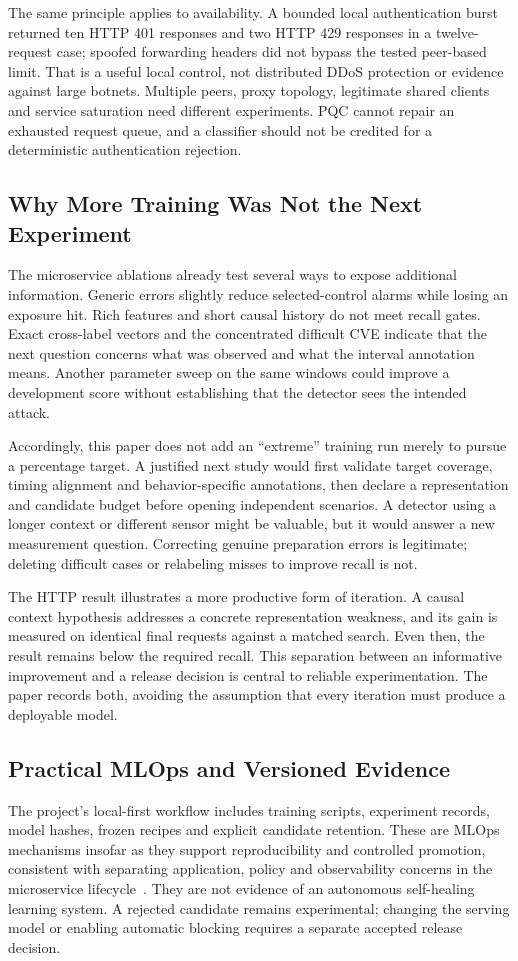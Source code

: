 \documentclass[conference,a4paper]{IEEEtran}
\begin{document}
The same principle applies to availability. A bounded local authentication burst returned ten HTTP 401 responses and two HTTP 429 responses in a twelve-request case; spoofed forwarding headers did not bypass the tested peer-based limit. That is a useful local control, not distributed DDoS protection or evidence against large botnets. Multiple peers, proxy topology, legitimate shared clients and service saturation need different experiments. PQC cannot repair an exhausted request queue, and a classifier should not be credited for a deterministic authentication rejection.

\subsection{Why More Training Was Not the Next Experiment}
The microservice ablations already test several ways to expose additional information. Generic errors slightly reduce selected-control alarms while losing an exposure hit. Rich features and short causal history do not meet recall gates. Exact cross-label vectors and the concentrated difficult CVE indicate that the next question concerns what was observed and what the interval annotation means. Another parameter sweep on the same windows could improve a development score without establishing that the detector sees the intended attack.

Accordingly, this paper does not add an ``extreme'' training run merely to pursue a percentage target. A justified next study would first validate target coverage, timing alignment and behavior-specific annotations, then declare a representation and candidate budget before opening independent scenarios. A detector using a longer context or different sensor might be valuable, but it would answer a new measurement question. Correcting genuine preparation errors is legitimate; deleting difficult cases or relabeling misses to improve recall is not.

The HTTP result illustrates a more productive form of iteration. A causal context hypothesis addresses a concrete representation weakness, and its gain is measured on identical final requests against a matched search. Even then, the result remains below the required recall. This separation between an informative improvement and a release decision is central to reliable experimentation. The paper records both, avoiding the assumption that every iteration must produce a deployable model.

\subsection{Practical MLOps and Versioned Evidence}
The project's local-first workflow includes training scripts, experiment records, model hashes, frozen recipes and explicit candidate retention. These are MLOps mechanisms insofar as they support reproducibility and controlled promotion, consistent with separating application, policy and observability concerns in the microservice lifecycle~\cite{devsecops}. They are not evidence of an autonomous self-healing learning system. A rejected candidate remains experimental; changing the serving model or enabling automatic blocking requires a separate accepted release decision.
\end{document}
